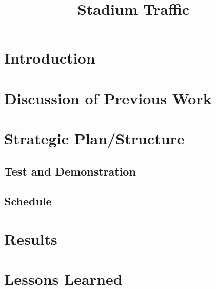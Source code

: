 \documentclass[12pt]{article}
\title{Stadium Traffic}
\begin{document}
\maketitle
\abstract



\newpage

\tableofcontents

\newpage

\mainmatter

\section{Introduction}



\section{Discussion of Previous Work}




\section{Strategic Plan/Structure}




\subsection{Test and Demonstration}



\subsection{Schedule}



\section{Results}
\label{sec-results}



\section{Lessons Learned}


\end{document}
